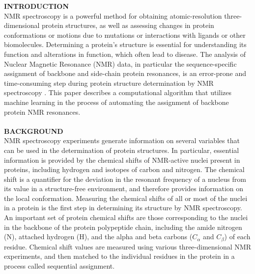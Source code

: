 \documentclass{article}
\begin{document}
\noindent \textbf{INTRODUCTION}\\
NMR spectroscopy is a powerful method for obtaining atomic-resolution three-dimensional protein structures, as well as assessing changes in protein conformations or motions due to mutations or interactions with ligands or other biomolecules. Determining a protein's structure is essential for understanding its function and alterations in function, which often lead to disease. The analysis of Nuclear Magnetic Resonance (NMR) data, in particular the sequence-specific assignment of backbone and side-chain protein resonances, is an error-prone and time-consuming step during protein structure determination by NMR spectroscopy \cite{aria}. This paper describes a computational algorithm that utilizes machine learning in the process of automating the assignment of backbone protein NMR resonances.
\\\\
\noindent \textbf{BACKGROUND}\\
NMR spectroscopy experiments generate information on several variables that can be used in the determination of protein structures. In particular, essential information is provided by the chemical shifts of NMR-active nuclei present in proteins, including hydrogen and isotopes of carbon and nitrogen. The chemical shift is a quantifier for the deviation in the resonant frequency of a nucleus from its value in a structure-free environment, and therefore provides information on the local conformation. Measuring the chemical shifts of all or most of the nuclei in a protein is the first step in determining its structure by NMR spectroscopy. An important set of protein chemical shifts are those corresponding to the nuclei in the backbone of the protein polypeptide chain, including the amide nitrogen (N), attached hydrogen (H), and the alpha and beta carbons ($C_{\alpha}$ and $C_{\beta}$) of each residue. Chemical shift values are measured using various three-dimensional NMR experiments, and then matched to the individual residues in the protein in a process called sequential assignment.	
			
\end{document}

